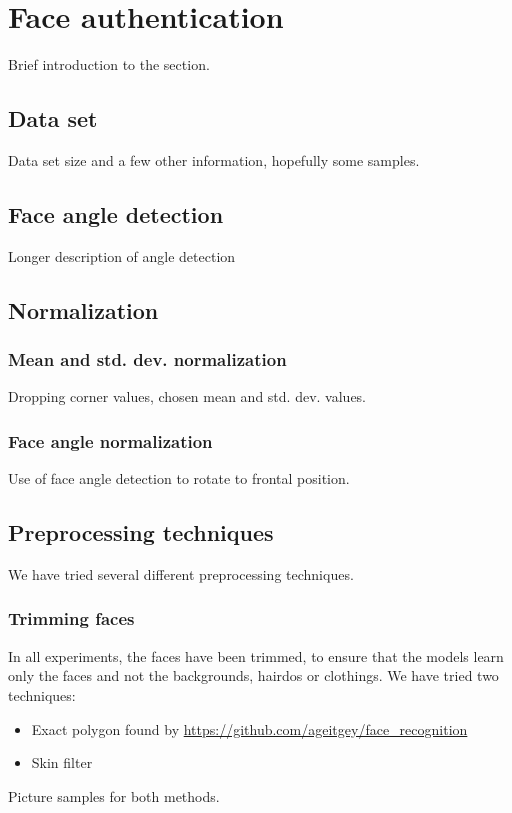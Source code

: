 \section{Face authentication}
    Brief introduction to the section.

    \subsection{Data set}
    Data set size and a few other information, hopefully some samples.

    \subsection{Face angle detection}
    Longer description of angle detection

    \subsection{Normalization}
        \subsubsection*{Mean and std. dev. normalization}
        Dropping corner values, chosen mean and std. dev. values.

        \subsubsection*{Face angle normalization}
        Use of face angle detection to rotate to frontal position.

    \subsection{Preprocessing techniques}
    We have tried several different preprocessing techniques.
        \subsubsection*{Trimming faces}
        In all experiments, the faces have been trimmed, to ensure that the
        models learn only the faces and not the backgrounds, hairdos or
        clothings.
        We have tried two techniques:
        \begin{itemize}
            \item Exact polygon found by \url{https://github.com/ageitgey/face_recognition}
            \item Skin filter
        \end{itemize}
        Picture samples for both methods.

